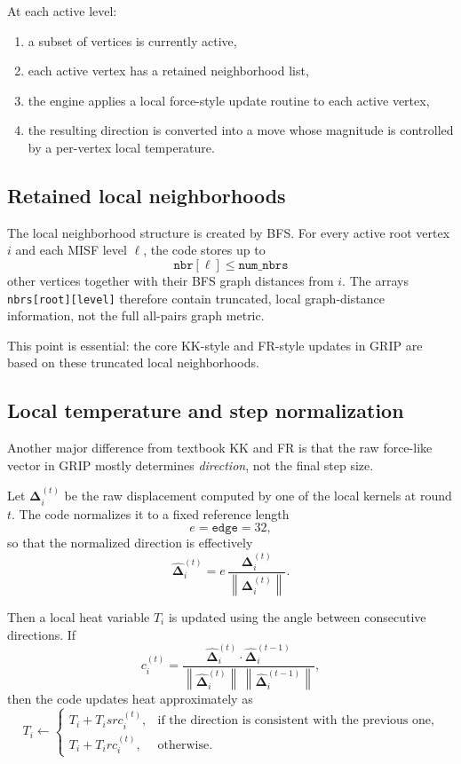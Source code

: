 \documentclass[11pt]{article}
\newcommand{\vect}[1]{\boldsymbol{#1}}
\newcommand{\norm}[1]{\left\lVert #1 \right\rVert}
\begin{document}
At each active level:
\begin{enumerate}[leftmargin=1.5em]
\item a subset of vertices is currently active,
\item each active vertex has a retained neighborhood list,
\item the engine applies a local force-style update routine to each active vertex,
\item the resulting direction is converted into a move whose magnitude is controlled by
a per-vertex local temperature.
\end{enumerate}

\subsection{Retained local neighborhoods}

The local neighborhood structure is created by BFS. For every active root vertex
$i$ and each MISF level $\ell$, the code stores up to
\[
\texttt{nbr}[\ell] \le \texttt{num\_nbrs}
\]
other vertices together with their BFS graph distances from $i$. The arrays
\texttt{nbrs[root][level]} therefore contain truncated, local graph-distance
information, not the full all-pairs graph metric.

This point is essential: the core KK-style and FR-style updates in GRIP are
based on these truncated local neighborhoods.

\subsection{Local temperature and step normalization}

Another major difference from textbook KK and FR is that the raw force-like
vector in GRIP mostly determines \emph{direction}, not the final step size.

Let $\vect{\Delta}_i^{(t)}$ be the raw displacement computed by one of the local
kernels at round $t$. The code normalizes it to a fixed reference length
\[
e = \texttt{edge} = 32,
\]
so that the normalized direction is effectively
\[
\widehat{\vect{\Delta}}_i^{(t)} = e \, \frac{\vect{\Delta}_i^{(t)}}{\norm{\vect{\Delta}_i^{(t)}}}.
\]

Then a local heat variable $T_i$ is updated using the angle between consecutive
directions. If
\[
c_i^{(t)} =
\frac{
\widehat{\vect{\Delta}}_i^{(t)} \cdot \widehat{\vect{\Delta}}_i^{(t-1)}
}{
\norm{\widehat{\vect{\Delta}}_i^{(t)}} \,
\norm{\widehat{\vect{\Delta}}_i^{(t-1)}}
},
\]
then the code updates heat approximately as
\[
T_i \leftarrow
\begin{cases}
T_i + T_i s r c_i^{(t)}, & \text{if the direction is consistent with the previous one},\\
T_i + T_i r c_i^{(t)}, & \text{otherwise}.
\end{cases}
\]
\end{document}
